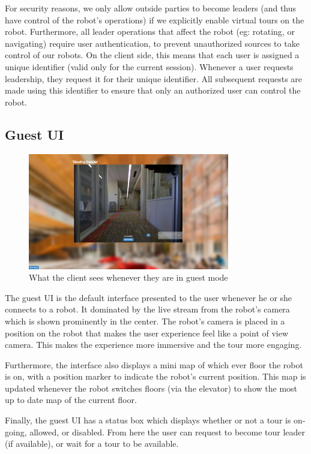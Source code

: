 \documentclass[
  oneside,
  11pt, a4paper,
  footinclude=true,
  headinclude=true,
  cleardoublepage=empty
]{article}
\begin{document}
For security reasons, we only allow outside parties to become leaders (and thus
have control of the robot's operations) if we explicitly enable virtual tours
on the robot. Furthermore, all leader operations that affect the robot (eg:
rotating, or navigating) require user authentication, to prevent unauthorized
sources to take control of our robots. On the client side, this means that each
user is assigned a unique identifier (valid only for the current session).
Whenever a user requests leadership, they request it for their unique
identifier. All subsequent requests are made using this identifier to ensure
that only an authorized user can control the robot.

\subsection{Guest UI}

\begin{figure}
\centering
\includegraphics[height=2in]{guestUI}
\caption{What the client sees whenever they are in guest mode}
\end{figure}

The guest UI is the default interface presented to the user whenever he or she
connects to a robot. It dominated by the live stream from the robot's camera
which is shown prominently in the center. The robot's camera is placed in a
position on the robot that makes the user experience feel like a point of view
camera. This makes the experience more immersive and the tour more engaging.

Furthermore, the interface also displays a mini map of which ever floor the
robot is on, with a position marker to indicate the robot's current position.
This map is updated whenever the robot switches floors (via the elevator) to
show the most up to date map of the current floor.

Finally, the guest UI has a status box which displays whether or not a tour is
on-going, allowed, or disabled. From here the user can request to become tour
leader (if available), or wait for a tour to be available.
\end{document}
